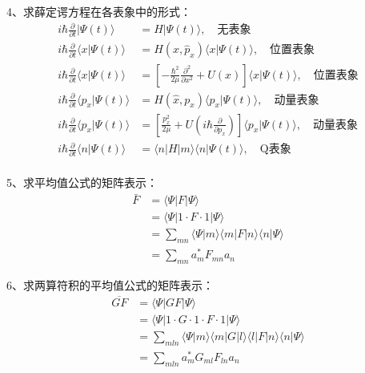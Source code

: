 \begin{frame} 
    4、求薛定谔方程在各表象中的形式： 
    $$ \begin{aligned}
    i \hbar \frac{\partial}{\partial t} |\Psi(t) \rangle &= H |\Psi(t) \rangle  , \quad \text{无表象}\\
    i \hbar \frac{\partial}{\partial t} \langle x|\Psi(t) \rangle &= H (x, \hat{p}_x) \langle x|\Psi(t) \rangle  , \quad \text{位置表象}\\
    i \hbar \frac{\partial}{\partial t} \langle x|\Psi(t) \rangle &= [- \frac{\hbar^2}{2\mu} \frac{\partial ^2 }{\partial x^2} + U(x)] \langle x|\Psi(t) \rangle  , \quad \text{位置表象}\\
    i \hbar \frac{\partial}{\partial t} \langle p_x|\Psi(t) \rangle &= H (\hat{x}, p_x) \langle p_x|\Psi(t) \rangle  , \quad \text{动量表象}\\
    i \hbar \frac{\partial}{\partial t} \langle p_x|\Psi(t) \rangle &=  [ \frac{p^2 _x}{2\mu} + U(i \hbar \frac{\partial }{\partial p_x}) ] \langle p_x|\Psi(t) \rangle  , \quad \text{动量表象}\\
    i \hbar \frac{\partial}{\partial t} \langle n|\Psi(t) \rangle &=  \langle n|H|m \rangle \langle n |\Psi(t) \rangle  , \quad \text{Q表象}\\
    \end{aligned}
    $$
\end{frame} 

\begin{frame} 
    5、求平均值公式的矩阵表示： 
    $$ \begin{aligned}
    \bar{F} &= \langle \Psi |F |\Psi \rangle  \\
    &= \langle \Psi |1 \cdot F \cdot 1 |\Psi \rangle  \\
    &= \sum_{mn} \langle \Psi |m\rangle\langle m |F| n\rangle\langle n |\Psi \rangle  \\
    &= \sum_{mn} a_m ^* F_{mn} a_n 
    \end{aligned}
    $$
\end{frame} 

\begin{frame} 
    6、求两算符积的平均值公式的矩阵表示： 
    $$ \begin{aligned}
    \overline{GF} &= \langle \Psi |GF |\Psi \rangle  \\
    &= \langle \Psi |1 \cdot G \cdot 1 \cdot F \cdot 1 |\Psi \rangle  \\
    &= \sum_{mln} \langle \Psi |m\rangle\langle m |G |l\rangle\langle l| F| n\rangle\langle n |\Psi \rangle  \\
    &= \sum_{mln} a_m ^* G_{ml} F_{ln} a_n 
    \end{aligned}
    $$
\end{frame} 



